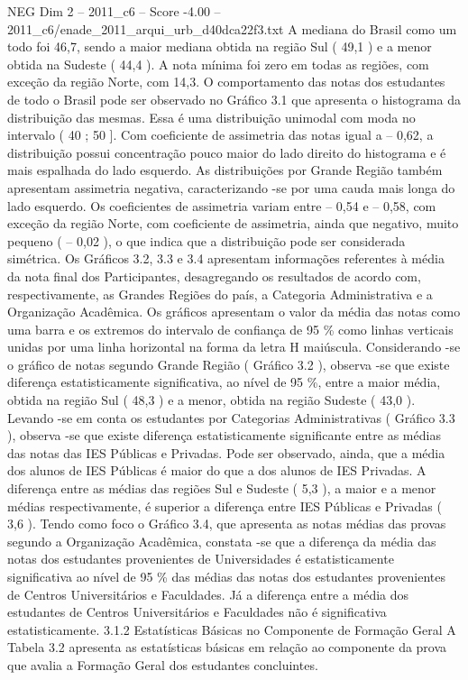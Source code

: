 \begin{textsample}{NEG Dim 2 – 2011\_c6 – Score -4.00 – 2011\_c6/enade\_2011\_arqui\_urb\_d40dca22f3.txt}
A mediana do Brasil como um todo foi 46,7, sendo a maior mediana obtida na região Sul ( 49,1 ) e a menor obtida na Sudeste ( 44,4 ).
A nota mínima foi zero em todas as regiões, com exceção da região Norte, com 14,3.
O comportamento das notas dos estudantes de todo o Brasil pode ser observado no Gráfico 3.1 que apresenta o histograma da distribuição das mesmas.
Essa é uma distribuição unimodal com moda no intervalo ( 40 ; 50 ].
Com coeficiente de assimetria das notas igual a – 0,62, a distribuição possui concentração pouco maior do lado direito do histograma e é mais espalhada do lado esquerdo.
As distribuições por Grande Região também apresentam assimetria negativa, caracterizando -se por uma cauda mais longa do lado esquerdo.
Os coeficientes de assimetria variam entre – 0,54 e – 0,58, com exceção da região Norte, com coeficiente de assimetria, ainda que negativo, muito pequeno ( – 0,02 ), o que indica que a distribuição pode ser considerada simétrica.
Os Gráficos 3.2, 3.3 e 3.4 apresentam informações referentes à média da nota final dos Participantes, desagregando os resultados de acordo com, respectivamente, as Grandes Regiões do país, a Categoria Administrativa e a Organização Acadêmica.
Os gráficos apresentam o valor da média das notas como uma barra e os extremos do intervalo de confiança de 95 \% como linhas verticais unidas por uma linha horizontal na forma da letra H maiúscula.
Considerando -se o gráfico de notas segundo Grande Região ( Gráfico 3.2 ), observa -se que existe diferença estatisticamente significativa, ao nível de 95 \%, entre a maior média, obtida na região Sul ( 48,3 ) e a menor, obtida na região Sudeste ( 43,0 ).
Levando -se em conta os estudantes por Categorias Administrativas ( Gráfico 3.3 ), observa -se que existe diferença estatisticamente significante entre as médias das notas das IES Públicas e Privadas.
Pode ser observado, ainda, que a média dos alunos de IES Públicas é maior do que a dos alunos de IES Privadas.
A diferença entre as médias das regiões Sul e Sudeste ( 5,3 ), a maior e a menor médias respectivamente, é superior a diferença entre IES Públicas e Privadas ( 3,6 ).
Tendo como foco o Gráfico 3.4, que apresenta as notas médias das provas segundo a Organização Acadêmica, constata -se que a diferença da média das notas dos estudantes provenientes de Universidades é estatisticamente significativa ao nível de 95 \% das médias das notas dos estudantes provenientes de Centros Universitários e Faculdades.
Já a diferença entre a média dos estudantes de Centros Universitários e Faculdades não é significativa estatisticamente. 3.1.2 Estatísticas Básicas no Componente de Formação Geral A Tabela 3.2 apresenta as estatísticas básicas em relação ao componente da prova que avalia a Formação Geral dos estudantes concluintes.

\end{textsample}
